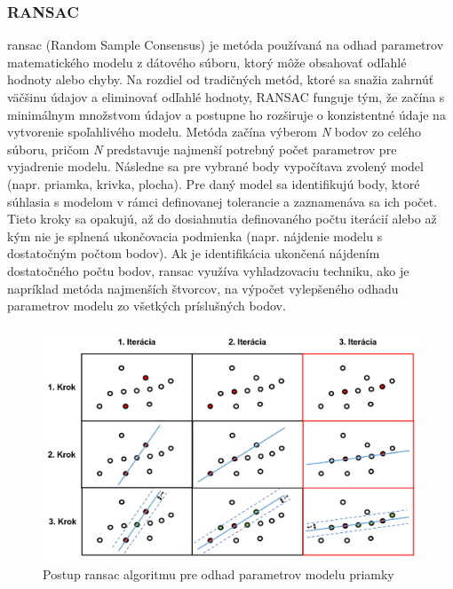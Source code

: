 \subsubsection{RANSAC}
\noindent \acrshort{ransac} (Random Sample Consensus) je metóda používaná na odhad parametrov matematického modelu z dátového súboru, ktorý môže obsahovať odľahlé hodnoty alebo chyby. Na rozdiel od tradičných metód, ktoré sa snažia zahrnúť väčšinu údajov a eliminovať odľahlé hodnoty, RANSAC funguje tým, že začína s minimálnym množstvom údajov a postupne ho rozširuje o konzistentné údaje na vytvorenie spoľahlivého modelu. \cite{RANSAC_original}
\newline\indent Metóda začína výberom \textit{N} bodov zo celého súboru, pričom \textit{N} predstavuje najmenší potrebný počet parametrov pre vyjadrenie modelu. Následne sa pre vybrané body vypočítava zvolený model (napr. priamka, krivka, plocha). Pre daný model sa identifikujú body, ktoré súhlasia s modelom v rámci definovanej tolerancie a zaznamenáva sa ich počet. Tieto kroky sa opakujú, až do dosiahnutia definovaného počtu iterácií alebo až kým nie je splnená ukončovacia podmienka (napr. nájdenie modelu s dostatočným počtom bodov). Ak je identifikácia ukončená nájdením dostatočného počtu bodov, \acrshort{ransac} využíva vyhladzovaciu techniku, ako je napríklad metóda najmenších štvorcov, na výpočet vylepšeného odhadu parametrov modelu zo všetkých príslušných bodov. \cite{RANSAC_original}
\begin{figure}[!htbp]
  \centering
  \includegraphics[width=16cm]{img/ransac_img.png}
  \caption{Postup \acrshort{ransac} algoritmu pre odhad parametrov modelu priamky}
  \label{ransac}
\end{figure} 

